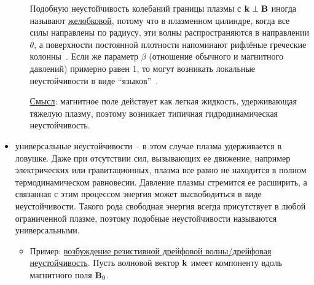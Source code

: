 \documentclass[10pt, a4paper]{article}
\begin{document}
\begin{itemize}
\begin{itemize}
		Подобную неустойчивость колебаний границы плазмы с $\vb{k}\perp\vb{B}$ иногда называют \uline{желобковой}, потому что в плазменном цилиндре, когда все силы направлены по радиусу, эти волны распространяются в направлении $\theta$, а поверхности постоянной плотности напоминают рифлёные греческие колонны~\cite{chen}.	Если же параметр $\beta$ (отношение обычного и магнитного давлений) примерно равен 1, то могут возникать локальные неустойчивости в виде ``языков''~\cite{arzimovich}. 
		
		\uline{Смысл}: магнитное поле действует как легкая жидкость, удерживающая тяжелую плазму, поэтому возникает типичная гидродинамическая неустойчивость.
		
	\end{itemize}

	\item универсальные неустойчивости -- в этом случае плазма удерживается в ловушке. Даже при отсутствии сил, вызывающих ее движение, например электрических или гравитационных, плазма все равно не находится в полном термодинамическом равновесии. Давление плазмы стремится ее расширить, а связанная с этим процессом энергия может высвободиться в виде неустойчивости. Такого рода свободная энергия всегда присутствует в любой ограниченной плазме, поэтому подобные неустойчивости называются универсальными.
	
	\begin{itemize}
		
		\item Пример: \uline{возбуждение резистивной дрейфовой волны/дрейфовая неустойчивость}. Пусть волновой вектор $\vb{k}$ имеет компоненту вдоль магнитного поля $\vb{B}_0$.
		

\end{itemize}
\end{itemize}
\end{document}
